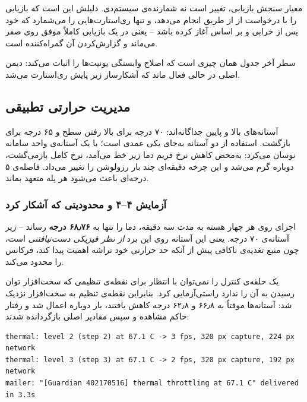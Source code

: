 معیار سنجش بازیابی، تغییر  است نه شمارنده‌ی  سیستم‌دی. دلیلش این است که  بازیابی را با درخواست  از  از طریق  انجام می‌دهد، و  تنها ری‌استارت‌هایی را می‌شمارد که خود  پس از خرابی و بر اساس  آغاز کرده باشد -- یعنی در یک بازیابی کاملاً موفق  روی صفر می‌ماند و گزارش‌کردن آن گمراه‌کننده است.

سطر آخر جدول همان چیزی است که اصلاح وابستگی یونیت‌ها را اثبات می‌کند: دیمن اصلی در حالی فعال ماند که آشکارساز زیر پایش ری‌استارت می‌شد.

\subsection{مدیریت حرارتی تطبیقی}

آستانه‌های بالا و پایین جداگانه‌اند: ۷۰ درجه برای بالا رفتن سطح و ۶۵ درجه برای بازگشت. استفاده از دو آستانه به‌جای یکی عمدی است؛ با یک آستانه‌ی واحد سامانه نوسان می‌کرد: به‌محض کاهش نرخ فریم دما زیر خط می‌آمد، نرخ کامل بازمی‌گشت، دوباره گرم می‌شد و این چرخه دقیقه‌ای چند بار رزولوشن را تغییر می‌داد. فاصله‌ی ۵ درجه‌ای باعث می‌شود هر پله متعهد بماند.

\subsubsection*{آزمایش ۴--۴ و محدودیتی که آشکار کرد}

اجرای  روی هر چهار هسته به مدت سه دقیقه، دما را تنها به \textbf{۶۸٫۷۶ درجه} رساند -- زیر آستانه‌ی ۷۰ درجه. یعنی این آستانه روی این برد \emph{از نظر فیزیکی دست‌نیافتنی} است، چون منبع تغذیه‌ی ناکافی پیش از آنکه حد حرارتی خود تراشه اهمیت پیدا کند، فرکانس را محدود می‌کند.

یک حلقه‌ی کنترل را نمی‌توان با انتظار برای نقطه‌ی تنظیمی که سخت‌افزار توان رسیدن به آن را ندارد راستی‌آزمایی کرد. بنابراین نقطه‌ی تنظیم به سخت‌افزار نزدیک شد: آستانه‌ها موقتاً به ۶۶٫۸ و ۶۲٫۸ درجه کاهش یافتند، بار دوباره اعمال شد و رفتار حاکم مشاهده و سپس مقادیر اصلی بازگردانده شدند:

\begin{latin}
\begin{verbatim}
thermal: level 2 (step 2) at 67.1 C -> 3 fps, 320 px capture, 224 px network
thermal: level 3 (step 3) at 67.1 C -> 2 fps, 320 px capture, 192 px network
mailer: "[Guardian 402170516] thermal throttling at 67.1 C" delivered in 3.3s
\end{verbatim}
\end{latin}

